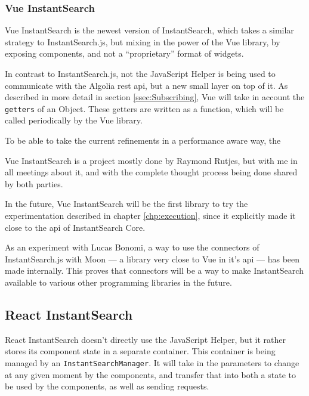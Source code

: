 
\subsubsection{Vue InstantSearch} %
\label{ssub:vue_instantsearch}

Vue InstantSearch is the newest version of InstantSearch, which takes a similar strategy to InstantSearch.js, but mixing in the power of the Vue \gls{library}, by exposing components, and not a ``proprietary'' format of widgets.

In contrast to InstantSearch.js, not the JavaScript Helper is being used to communicate with the Algolia \acrshort{rest} \acrshort{api}, but a new small layer on top of it. As described in more detail in section \ref{ssec:Subscribing}, Vue will take in account the {\tt getters} of an Object. These getters are written as a function, which will be called periodically by the Vue \gls{library}. 

To be able to take the current refinements in a performance aware way, the 

Vue InstantSearch is a project mostly done by Raymond Rutjes, but with me in all meetings about it, and with the complete thought process being done shared by both parties.

In the future, Vue InstantSearch will be the first \gls{library} to try the experimentation described in chapter \ref{chp:execution}, since it explicitly made it close to the \acrshort{api} of InstantSearch Core.

As an experiment with Lucas Bonomi, a way to use the connectors of InstantSearch.js with Moon --- a \gls{library} very close to Vue in it's \acrshort{api} --- has been made internally. This proves that connectors will be a way to make InstantSearch available to various other programming libraries in the future.




\subsection{React InstantSearch} %
\label{sub:react_instantearch}

React InstantSearch doesn't directly use the JavaScript Helper, but it rather stores its component state in a separate container. This container is being managed by an {\tt InstantSearchManager}. It will take in the parameters to change at any given moment by the components, and transfer that into both a state to be used by the components, as well as sending requests.

